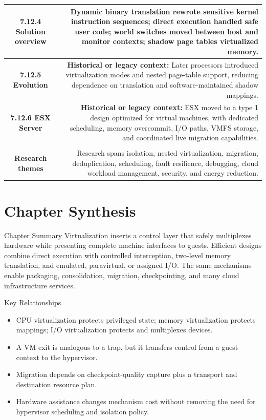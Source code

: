 \documentclass[10pt,letterpaper]{article}
\begin{document}
\begin{longtable}{C N}
\textbf{7.12.4 Solution overview} & Dynamic binary translation rewrote sensitive kernel instruction sequences; direct execution handled safe user code; world switches moved between host and monitor contexts; shadow page tables virtualized memory.\\\hline
\textbf{7.12.5 Evolution} & \textcolor{legacy}{\textbf{Historical or legacy context:}} Later processors introduced virtualization modes and nested page-table support, reducing dependence on translation and software-maintained shadow mappings.\\\hline
\textbf{7.12.6 ESX Server} & \textcolor{legacy}{\textbf{Historical or legacy context:}} ESX moved to a type 1 design optimized for virtual machines, with dedicated scheduling, memory overcommit, I/O paths, VMFS storage, and coordinated live migration capabilities.\\\hline
{}\\*\hline
\textbf{Research themes} & Research spans isolation, nested virtualization, migration, deduplication, scheduling, fault resilience, debugging, cloud workload management, security, and energy reduction.\\\hline
\end{longtable}
\normalsize

\section*{Chapter Synthesis}
\begin{studybox}{Chapter Summary}
Virtualization inserts a control layer that safely multiplexes hardware while presenting complete machine interfaces to guests. Efficient designs combine direct execution with controlled interception, two-level memory translation, and emulated, paravirtual, or assigned I/O. The same mechanisms enable packaging, consolidation, migration, checkpointing, and many cloud infrastructure services.
\end{studybox}

\begin{studybox}{Key Relationships}
\begin{itemize}
  \item CPU virtualization protects privileged state; memory virtualization protects mappings; I/O virtualization protects and multiplexes devices.
  \item A VM exit is analogous to a trap, but it transfers control from a guest context to the hypervisor.
  \item Migration depends on checkpoint-quality capture plus a transport and destination resource plan.
  \item Hardware assistance changes mechanism cost without removing the need for hypervisor scheduling and isolation policy.
\end{itemize}
\end{studybox}
\end{document}

